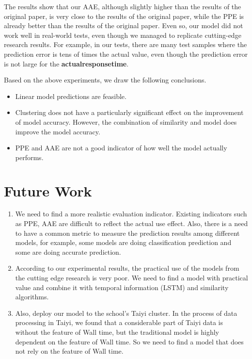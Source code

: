 \documentclass[conference,compsoc]{IEEEtran}
\begin{document}
The results show that our AAE, although slightly higher than the results of the original paper, is very close to the results of the original paper, while the PPE is already better than the results of the original paper. Even so, our model did not work well in real-world tests,  even though we managed to replicate cutting-edge research results. For example, in our tests, there are many test samples where the prediction error is tens of times the actual value, even though the prediction error is not large for the \textbf{actualresponsetime}.

Based on the above experiments, we draw the following conclusions.
\begin{itemize}
	\item Linear model predictions are feasible.
	\item Clustering does not have a particularly significant effect on the improvement of model accuracy. However, the combination of similarity and model does improve the model accuracy.
	\item PPE and AAE are not a good indicator of how well the model actually performs.
\end{itemize}

\section{Future Work}

\begin{enumerate}
	\item We need to find a more realistic evaluation indicator. Existing indicators such as PPE, AAE are difficult to reflect the actual use effect. Also, there is a need to have a common metric to measure the prediction results among different models, for example, some models are doing classification prediction and some are doing accurate prediction.
	
	\item According to our experimental results, the practical use of the models from the cutting edge research is very poor. We need to find a model with practical value and combine it with temporal information (LSTM) and similarity algorithms.
	
	\item Also, deploy our model to the school's Taiyi cluster. In the process of data processing in Taiyi, we found that a considerable part of Taiyi data is without the feature of Wall time, but the traditional model is highly dependent on the feature of Wall time. So we need to find a model that does not rely on the feature of Wall time.
\end{enumerate}
\end{document}
